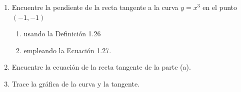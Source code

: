 \item 
    \begin{enumerate}
        \item Encuentre la pendiente de la recta tangente a la curva $y = x^3$ en el punto $(-1, -1)$
        \begin{enumerate}
            \item[(i)] usando la Definición 1.26
            \item[(ii)] empleando la Ecuación 1.27.
        \end{enumerate}
        \item Encuentre la ecuación de la recta tangente de la parte (a).
        \item Trace la gráfica de la curva y la tangente.
    \end{enumerate}
